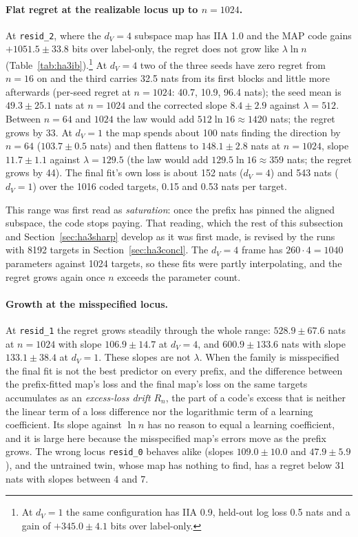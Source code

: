 \documentclass[11pt,a4paper]{article}
\newcommand{\dv}{d_V}
\begin{document}
\paragraph{Flat regret at the realizable locus up to $n=1024$.} At \texttt{resid\_2}, where the $\dv=4$ subspace map has IIA 1.0 and the MAP code gains $+1051.5\pm33.8$ bits over label-only, the regret does not grow like $\lambda\ln n$ (Table~\ref{tab:ha3ib}).\footnote{At $\dv=1$ the same configuration has IIA 0.9, held-out log loss 0.5 nats and a gain of $+345.0\pm4.1$ bits over label-only.} At $\dv=4$ two of the three seeds have zero regret from $n=16$ on and the third carries 32.5 nats from its first blocks and little more afterwards (per-seed regret at $n=1024$: 40.7, 10.9, 96.4 nats); the seed mean is $49.3\pm25.1$ nats at $n=1024$ and the corrected slope $8.4\pm2.9$ against $\lambda=512$. Between $n=64$ and $1024$ the law would add $512\ln16\approx1420$ nats; the regret grows by 33. At $\dv=1$ the map spends about 100 nats finding the direction by $n=64$ ($103.7\pm0.5$ nats) and then flattens to $148.1\pm2.8$ nats at $n=1024$, slope $11.7\pm1.1$ against $\lambda=129.5$ (the law would add $129.5\ln16\approx359$ nats; the regret grows by 44). The final fit's own loss is about 152 nats ($\dv=4$) and 543 nats ($\dv=1$) over the 1016 coded targets, 0.15 and 0.53 nats per target.

This range was first read as \emph{saturation}: once the prefix has pinned the aligned subspace, the code stops paying. That reading, which the rest of this subsection and Section~\ref{sec:ha3sharp} develop as it was first made, is revised by the runs with 8192 targets in Section~\ref{sec:ha3concl}. The $\dv=4$ frame has $260\cdot4=1040$ parameters against 1024 targets, so these fits were partly interpolating, and the regret grows again once $n$ exceeds the parameter count.

\paragraph{Growth at the misspecified locus.} At \texttt{resid\_1} the regret grows steadily through the whole range: $528.9\pm67.6$ nats at $n=1024$ with slope $106.9\pm14.7$ at $\dv=4$, and $600.9\pm133.6$ nats with slope $133.1\pm38.4$ at $\dv=1$. These slopes are not $\lambda$. When the family is misspecified the final fit is not the best predictor on every prefix, and the difference between the prefix-fitted map's loss and the final map's loss on the same targets accumulates as an \emph{excess-loss drift} $R_n$, the part of a code's excess that is neither the linear term of a loss difference nor the logarithmic term of a learning coefficient. Its slope against $\ln n$ has no reason to equal a learning coefficient, and it is large here because the misspecified map's errors move as the prefix grows. The wrong locus \texttt{resid\_0} behaves alike (slopes $109.0\pm10.0$ and $47.9\pm5.9$), and the untrained twin, whose map has nothing to find, has a regret below 31 nats with slopes between 4 and 7.
\end{document}
